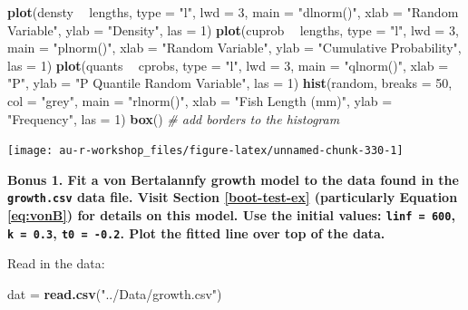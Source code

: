 \documentclass[]{book}
\newenvironment{Shaded}{\begin{snugshade}}{\end{snugshade}}
\newcommand{\KeywordTok}[1]{\textcolor[rgb]{0.13,0.29,0.53}{\textbf{#1}}}
\newcommand{\DataTypeTok}[1]{\textcolor[rgb]{0.13,0.29,0.53}{#1}}
\newcommand{\DecValTok}[1]{\textcolor[rgb]{0.00,0.00,0.81}{#1}}
\newcommand{\StringTok}[1]{\textcolor[rgb]{0.31,0.60,0.02}{#1}}
\newcommand{\CommentTok}[1]{\textcolor[rgb]{0.56,0.35,0.01}{\textit{#1}}}
\newcommand{\OperatorTok}[1]{\textcolor[rgb]{0.81,0.36,0.00}{\textbf{#1}}}
\newcommand{\NormalTok}[1]{#1}
\theoremstyle{definition}
\theoremstyle{definition}
\theoremstyle{definition}
\theoremstyle{remark}
\begin{document}
\begin{Shaded}
\begin{Highlighting}[]
\KeywordTok{plot}\NormalTok{(densty }\OperatorTok{~}\StringTok{ }\NormalTok{lengths, }\DataTypeTok{type =} \StringTok{"l"}\NormalTok{, }\DataTypeTok{lwd =} \DecValTok{3}\NormalTok{, }\DataTypeTok{main =} \StringTok{"dlnorm()"}\NormalTok{,}
     \DataTypeTok{xlab =} \StringTok{"Random Variable"}\NormalTok{, }\DataTypeTok{ylab =} \StringTok{"Density"}\NormalTok{, }\DataTypeTok{las =} \DecValTok{1}\NormalTok{)}
\KeywordTok{plot}\NormalTok{(cuprob }\OperatorTok{~}\StringTok{ }\NormalTok{lengths, }\DataTypeTok{type =} \StringTok{"l"}\NormalTok{, }\DataTypeTok{lwd =} \DecValTok{3}\NormalTok{, }\DataTypeTok{main =} \StringTok{"plnorm()"}\NormalTok{,}
     \DataTypeTok{xlab =} \StringTok{"Random Variable"}\NormalTok{, }\DataTypeTok{ylab =} \StringTok{"Cumulative Probability"}\NormalTok{, }\DataTypeTok{las =} \DecValTok{1}\NormalTok{)}
\KeywordTok{plot}\NormalTok{(quants }\OperatorTok{~}\StringTok{ }\NormalTok{cprobs, }\DataTypeTok{type =} \StringTok{"l"}\NormalTok{, }\DataTypeTok{lwd =} \DecValTok{3}\NormalTok{, }\DataTypeTok{main =} \StringTok{"qlnorm()"}\NormalTok{,}
     \DataTypeTok{xlab =} \StringTok{"P"}\NormalTok{, }\DataTypeTok{ylab =} \StringTok{"P Quantile Random Variable"}\NormalTok{, }\DataTypeTok{las =} \DecValTok{1}\NormalTok{)}
\KeywordTok{hist}\NormalTok{(random, }\DataTypeTok{breaks =} \DecValTok{50}\NormalTok{, }\DataTypeTok{col =} \StringTok{"grey"}\NormalTok{, }\DataTypeTok{main =} \StringTok{"rlnorm()"}\NormalTok{,}
     \DataTypeTok{xlab =} \StringTok{"Fish Length (mm)"}\NormalTok{, }\DataTypeTok{ylab =} \StringTok{"Frequency"}\NormalTok{, }\DataTypeTok{las =} \DecValTok{1}\NormalTok{)}
\KeywordTok{box}\NormalTok{() }\CommentTok{# add borders to the histogram}
\end{Highlighting}
\end{Shaded}

\begin{center}\texttt{[image: au-r-workshop\_files/figure-latex/unnamed-chunk-330-1]} \end{center}

\textbf{Bonus 1. Fit a von Bertalannfy growth model to the data found in
the \texttt{growth.csv} data file. Visit Section \ref{boot-test-ex}
(particularly Equation \eqref{eq:vonB}) for details on this model. Use the
initial values: \texttt{linf\ =\ 600}, \texttt{k\ =\ 0.3},
\texttt{t0\ =\ -0.2}. Plot the fitted line over top of the data.}

Read in the data:

\begin{Shaded}
\begin{Highlighting}[]
\NormalTok{dat =}\StringTok{ }\KeywordTok{read.csv}\NormalTok{(}\StringTok{"../Data/growth.csv"}\NormalTok{)}
\end{Highlighting}
\end{Shaded}
\end{document}
